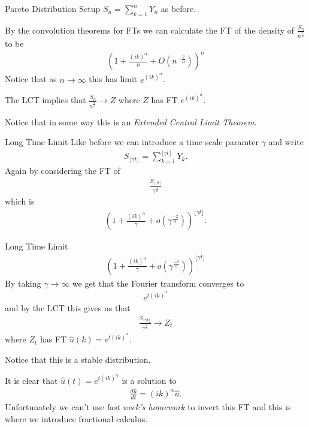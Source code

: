 \documentclass[pdf]{beamer}
\newcommand{\lra}{\longrightarrow}
\begin{document}
\begin{frame}{Pareto Distribution}
    Setup $ S_n = \sum_{k=1}^n Y_n $ as before.
    
    By the convolution theorems for FTs we can calculate the FT of the density of $ \frac{S_n}{n^\frac{1}{\alpha}} $ to be
    \begin{align}
        \left( 1 + \frac{(ik)^\alpha}{n} + O(n^{-\frac{2}{\alpha}}) \right)^n
    \end{align}
    Notice that as $ n \lra \infty $ this has limit $ e^{(ik)^\alpha} $.
    
    The LCT implies that $ \frac{S_n}{n^\frac{1}{\alpha}} \lra Z $ where $ Z $ has FT $ e^{(ik)^\alpha} $.
    
    Notice that in some way this is an \emph{Extended Central Limit Theorem}.
\end{frame}

\begin{frame}{Long Time Limit}
    Like before we can introduce a time scale paramter $ \gamma $ and write
    \begin{align}
        S_{\lfloor \gamma t \rfloor} = \sum_{k=1}^{\lfloor \gamma t \rfloor}Y_k.
    \end{align}
    Again by considering the FT of 
    \begin{align}
        \frac{S_{\lfloor \gamma t \rfloor}}{\gamma^\frac{1}{\alpha}}
    \end{align}
    which is
    \begin{align}
        \left( 1 + \frac{(ik)^\alpha}{\gamma} + o(\gamma^\frac{-2}{\alpha})\right)^{\lfloor \gamma t \rfloor}.
    \end{align}
\end{frame}

\begin{frame}{Long Time Limit}
    \begin{align}
            \left( 1 + \frac{(ik)^\alpha}{\gamma} + o(\gamma^\frac{-2}{\alpha})\right)^{\lfloor \gamma t \rfloor}
        \end{align}
        By taking $ \gamma \lra \infty $ we get that the Fourier transform converges to
        \begin{align}
            e^{t(ik)^\alpha}
        \end{align}
    and by the LCT this gives us that 
    \begin{align}
        \frac{S_{\lfloor \gamma t \rfloor}}{\gamma^\frac{1}{\alpha}} \lra Z_t
    \end{align}
    where $ Z_t $ has FT $ \hat{u}(k) = e^{t(ik)^\alpha} $.
    
    Notice that this is a stable distribution.
\end{frame}
\begin{frame}
    It is clear that $ \hat{u}(t) = e^{t(ik)^\alpha} $ is a solution to
    \begin{align}
        \frac{d\hat{u}}{dt} = (ik)^\alpha \hat{u}.
    \end{align}
    Unfortunately we can't use \emph{last week's homework} to invert this FT and this is where we introduce fractional calculus.
\end{frame}
\end{document}
